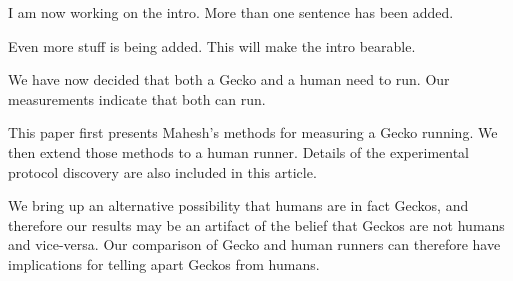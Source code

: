 I am now working on the intro. More than one sentence has been added.

Even more stuff is being added. This will make the intro bearable.

We have now decided that both a Gecko and a human need to run. Our measurements indicate that both can run.

This paper first presents Mahesh's methods for measuring a Gecko running. We then extend those methods to a human runner. Details of the experimental protocol discovery are also included in this article.

We bring up an alternative possibility that humans are in fact Geckos, and therefore our results may be an artifact of the belief that Geckos are not humans and vice-versa. Our comparison of Gecko and human runners can therefore have implications for telling apart Geckos from humans.
